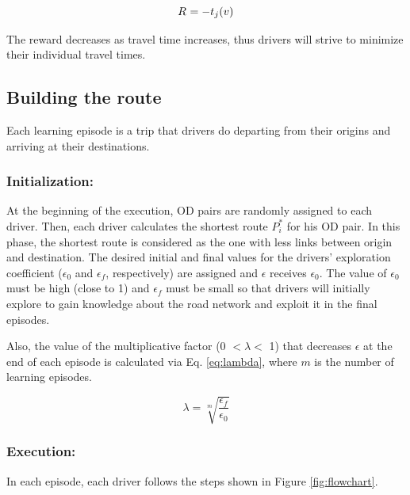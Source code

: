 \documentclass{RITA}
\newcommand{\travTime}{\ensuremath{t_j}} 	%
\newcommand{\veh}{\ensuremath{v}}		%
\newcommand{\reward}[1][]{\ensuremath{R_#1}}	%
\begin{document}
\begin{equation}
\label{eq:reward}
\reward{} = - \travTime(\veh)
\end{equation}

The reward decreases as travel time increases, thus drivers will strive to minimize their individual travel times.

\subsection{Building the route}

Each learning episode is a trip that drivers do departing from their origins and arriving at their destinations.

\subsubsection{Initialization:}
At the beginning of the execution, OD pairs are randomly assigned to each driver. Then, each driver calculates the shortest route $P_i^*$ for his OD pair. In this phase, the shortest route is considered as the one with less links between origin and destination. The desired initial and final values for the drivers' exploration coefficient ($\epsilon_0$ and $\epsilon_f$, respectively) are assigned and $\epsilon$ receives $\epsilon_0$. The value of $\epsilon_0$ must be high (close to 1) and $\epsilon_f$ must be small so that drivers will initially explore to gain knowledge about the road network and exploit it in the final episodes.

Also, the value of the multiplicative factor (0 $< \lambda <$ 1) that decreases $\epsilon$ at the end of each episode is calculated via Eq. \eqref{eq:lambda}, where $m$ is the number of learning episodes.

\begin{equation}
\label{eq:lambda}
\lambda = \sqrt[m]{\frac{\epsilon_f}{\epsilon_0}}
\end{equation}

\subsubsection{Execution:}

In each episode, each driver follows the steps shown in Figure \ref{fig:flowchart}.
\end{document}
